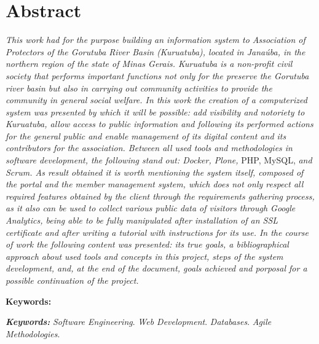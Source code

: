 \chapter*{Abstract}
\vspace{0.4cm}
\noindent \textit{This work had for the purpose building an information system to Association of Protectors of the Gorutuba River Basin (Kuruatuba), located in Janaúba, in the northern region of the state of Minas Gerais. 
Kuruatuba is a non-profit civil society that performs important functions not only for the preserve the Gorutuba river basin but also in carrying out community activities to provide the community in general social welfare.
In this work the creation of a computerized system was presented by which it will be possible: add visibility and notoriety to Kuruatuba, allow access to public information and following its performed actions for the general public and enable management of its digital content and its contributors for the association.
Between all used tools and methodologies in software development, the following stand out: Docker, Plone,} PHP, MySQL, \textit{and Scrum.
As result obtained it is worth mentioning the system itself, composed of the portal and the member management system, which does not only respect all required features obtained by the client through the requirements gathering process, as it also can be used to collect various public data of visitors through Google Analytics, being able to be fully manipulated after installation of an SSL certificate and after writing a tutorial with instructions for its use.
In the course of work the following content was presented: its true goals, a bibliographical approach about used tools and concepts in this project, steps of the system development, and, at the end of the document, goals achieved and porposal for a possible continuation of the project.}

\begin{labeling}{\textbf{Keywords:}}
\item[\textit{\textbf{Keywords:}}] 
\textit{Software Engineering}.
\textit{Web Development}.
\textit{Databases}.
\textit{Agile Methodologies}.
\end{labeling}

